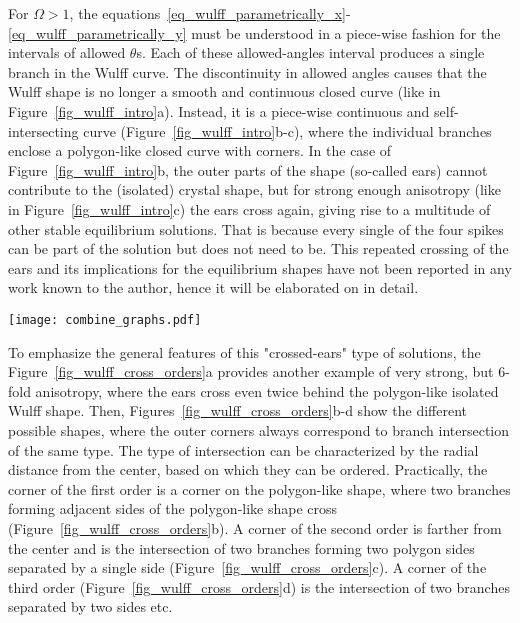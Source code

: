For $\Omega>1$, the equations~\eqref{eq_wulff_parametrically_x}-\eqref{eq_wulff_parametrically_y} must be understood in a piece-wise fashion for the intervals of allowed $\theta$s. Each of these allowed-angles interval produces a single branch in the Wulff curve. The discontinuity in allowed angles causes that the Wulff shape is no longer a smooth and continuous closed curve (like in Figure~\ref{fig_wulff_intro}a). Instead, it is a piece-wise continuous and self-intersecting curve (Figure~\ref{fig_wulff_intro}b-c), where the individual branches enclose a polygon-like closed curve with corners. In the case of Figure~\ref{fig_wulff_intro}b, the outer parts of the shape (so-called ears) cannot contribute to the (isolated) crystal shape, but for strong enough anisotropy (like in Figure~\ref{fig_wulff_intro}c) the ears cross again, giving rise to a multitude of other stable equilibrium solutions. That is because every single of the four spikes can be part of the solution but does not need to be. This repeated crossing of the ears and its implications for the equilibrium shapes have not been reported in any work known to the author, hence it will be elaborated on in detail. 

\begin{figure*}[h]
	\centering
	\texttt{[image: combine\_graphs.pdf]}
	\caption{Orders of corners, defined by the branches intersections, shown for 6-fold anisotropy and $\delta=0.7$. In a) there are all the allowed angles, in b)-d) are the stable equilibrium shapes defined by the b) first order, c) second order and d) third order of the corners. Any closed curve is a stable equilibrium shape, which connects these corners along the allowed-angles branches and has the interface normals pointing outwards in every point.}
	\label{fig_wulff_cross_orders}
\end{figure*}

To emphasize the general features of this "crossed-ears" type of solutions, the Figure~\ref{fig_wulff_cross_orders}a provides another example of very strong, but 6-fold anisotropy, where the ears cross even twice behind the polygon-like isolated Wulff shape. Then, Figures~\ref{fig_wulff_cross_orders}b-d show the different possible shapes, where the outer corners always correspond to branch intersection of the same type. The type of intersection can be characterized by the radial distance from the center, based on which they can be ordered. Practically, the corner of the first order is a corner on the polygon-like shape, where two branches forming adjacent sides of the polygon-like shape cross (Figure~\ref{fig_wulff_cross_orders}b). A corner of the second order is farther from the center and is the intersection of two branches forming two polygon sides separated by a single side (Figure~\ref{fig_wulff_cross_orders}c). A corner of the third order (Figure~\ref{fig_wulff_cross_orders}d) is the intersection of two branches separated by two sides etc.

